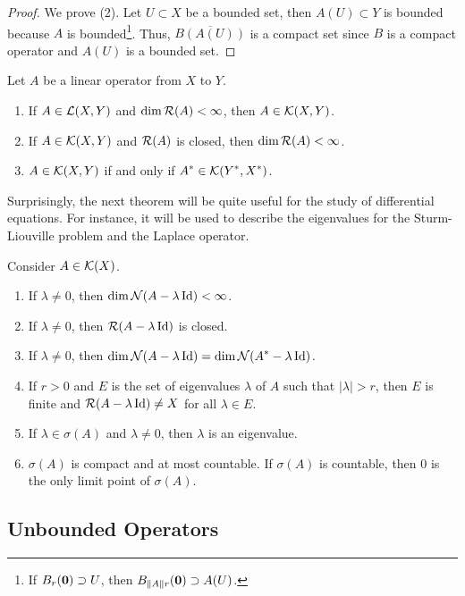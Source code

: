 \begin{proof}
We prove (2).  Let $U\subset X$ be a bounded set, then
$A(U) \subset Y$ is bounded because $A$ is bounded\footnote{If
$B_r(\mathbf{0}) \supset U$, then $B_{\|A\|r}(\mathbf{0}) \supset A(U)$.}.
Thus, $\overline{B(A(U))}$ is a compact set since $B$ is a compact
operator and $A(U)$ is a bounded set.
\end{proof}

\begin{theorem} \label{fa_finit_compact}
Let $A$ be a linear operator from $X$ to $Y$.
\begin{enumerate}
\item If $A \in \mathcal{L}(X,Y)$ and $\dim \mathcal{R}(A) < \infty$, then $A \in \mathcal{K}(X,Y)$.
\item If $A \in \mathcal{K}(X,Y)$ and $\mathcal{R}(A)$ is closed, then
$\dim \mathcal{R}(A) < \infty$.
\item $A \in \mathcal{K}(X,Y)$ if and only if
$\displaystyle A^\ast \in \mathcal{K}(Y^\ast, X^\ast)$.
\end{enumerate}
\end{theorem}

Surprisingly, the next theorem will be quite useful for the study of
differential equations.  For instance, it will be used to describe the
eigenvalues for the Sturm-Liouville problem and the Laplace operator.

\begin{theorem} \label{fu_an_comp_oper}
Consider $A \in \mathcal{K}(X)$.
\begin{enumerate}
\item If $\lambda \neq 0$, then $\dim \mathcal{N}(A-\lambda \operatorname{Id}) < \infty$.
\item If $\lambda \neq 0$, then $\mathcal{R}(A-\lambda \operatorname{Id})$ is closed.
\item If $\lambda \neq 0$, then
$\displaystyle \dim \mathcal{N}(A-\lambda \operatorname{Id}) = \dim \mathcal{N}(A^\ast-\lambda \operatorname{Id})$.
\item If $r>0$ and $E$ is the set of eigenvalues $\lambda$ of $A$ such
that $|\lambda|>r$, then $E$ is finite and $\mathcal{R}(A-\lambda \operatorname{Id}) \neq X$
for all $\lambda \in E$.
\item If $\lambda \in \sigma(A)$ and $\lambda \neq 0$, then $\lambda$
is an eigenvalue.
\item $\sigma(A)$ is compact and at most countable.  If $\sigma(A)$ is
countable, then $0$ is the only limit point of $\sigma(A)$.
\end{enumerate}
\end{theorem}

\subsection{Unbounded Operators}

